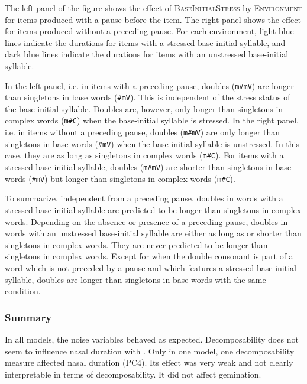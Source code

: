 The left panel of the figure shows the effect of \textsc{BaseInitialStress} by \textsc{Environment} for items produced with a pause before the item. The right panel shows the effect for items produced without a preceding pause. For each environment, light blue lines indicate the durations for items with a stressed base-initial syllable, and dark blue lines indicate the durations for items with an unstressed base-initial syllable.


In the left panel, i.e. in items with a preceding pause, doubles (\texttt{m\#mV}) are longer than singletons in base words (\texttt{\#mV}). This is independent of the stress status of the base-initial syllable. Doubles are, however, only longer than singletons in complex words (\texttt{m\#C}) when the base-initial syllable is stressed.
In the right panel, i.e. in items without a preceding pause, doubles (\texttt{m\#mV}) are only longer than singletons in base words (\texttt{\#mV}) when the base-initial syllable is unstressed. In this case, they are as long as singletons in complex words (\texttt{m\#C}). For items with a stressed base-initial syllable, doubles (\texttt{m\#mV}) are shorter than singletons in base words (\texttt{\#mV}) but longer than singletons in complex words (\texttt{m\#C}).

To summarize, independent from a preceding pause, doubles in words with a stressed base-initial syllable are predicted to be longer than singletons in complex words. Depending on the absence or presence of a preceding pause, doubles in words with an unstressed base-initial syllable are either as long as or shorter than singletons in complex words. They are never predicted to be longer than singletons in complex words. 
Except for when the double consonant is part of a word which is not preceded by a pause and which features a stressed base-initial syllable, doubles are longer than singletons in base words with the same condition.


\subsubsection{Summary}


In all models, the noise variables behaved as expected. Decomposability does not seem to influence nasal duration with . Only in one model, one decomposability measure affected nasal duration (\textsc{PC4}). Its effect was very weak and not clearly interpretable in terms of decomposability. It did not affect gemination.


